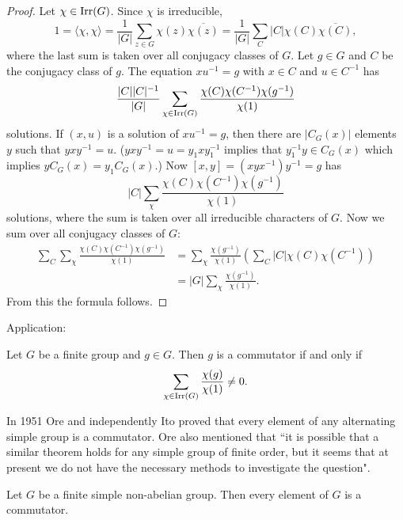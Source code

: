 \begin{proof}
    Let $\chi\in\operatorname{Irr}(G)$. Since $\chi$ is irreducible, 
    \[
    1=\langle\chi,\chi\rangle
    =\frac{1}{|G|}\sum_{z\in G}\chi(z)\overline{\chi(z)}
    =\frac{1}{|G|}\sum_{C}|C|\chi(C)\overline{\chi(C)},
    \]
    where the last sum is taken over all conjugacy classes of $G$. 
    Let $g\in G$ and $C$ be the conjugacy class of $g$. The equation
    $xu^{-1}=g$ with $x\in C$ and $u\in C^{-1}$ has 
    \[
        \frac{|C||C|^{-1}}{|G|}\sum_{\chi\in\operatorname{Irr}(G)}\frac{\chi(C)\chi(C^{-1})\chi(g^{-1})}{\chi(1)}
    \]
    solutions. If $(x,u)$ is a solution of $xu^{-1}=g$, then
    there are $|C_G(x)|$ elements $y$ such that $yxy^{-1}=u$. ($yxy^{-1}=u=y_1xy_1^{-1}$ implies that $y_1^{-1}y\in C_G(x)$ which implies $yC_G(x)=y_1C_G(x)$.) Now 
    $[x,y]=(xyx^{-1})y^{-1}=g$ has 
    \[
    |C|\sum_{\chi}\frac{\chi(C)\chi(C^{-1})\chi(g^{-1})}{\chi(1)}
    \]
    solutions, where the sum is taken over all irreducible characters of $G$. 
    Now we sum over all conjugacy classes of $G$:
    \begin{align*}
        \sum_{C}\sum_{\chi}\frac{\chi(C)\chi(C^{-1})\chi(g^{-1})}{\chi(1)}
        &=\sum_{\chi}\frac{\chi(g^{-1})}{\chi(1)}\left(\sum_C|C|\chi(C)\chi(C^{-1})\right)\\
        &=|G|\sum_{\chi}\frac{\chi(g^{-1})}{\chi(1)}.
    \end{align*}
    From this the formula follows. 
\end{proof}

Application:

\begin{corollary}
    Let $G$ be a finite group and $g\in G$. Then $g$ 
    is a commutator if and only if 
    \[
    \sum_{\chi\in\operatorname{Irr}(G)}\frac{\chi(g)}{\chi(1)}\ne0.
    \]
\end{corollary}

\label{Ore}

In 1951 Ore and independently Ito
proved that every element of any alternating simple group is a commutator. 
Ore also mentioned that ``it is possible that a similar theorem holds for any simple group of finite order, but it seems that at present we do not have the necessary methods to investigate the question". 

\begin{conjecture}[Ore]
\label{conjecture:Ore}
    Let $G$ be a finite simple non-abelian group. 
    Then every element of $G$ is a commutator. 
\end{conjecture}


